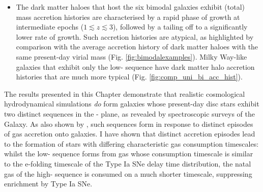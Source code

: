 \begin{itemize}
\item The dark matter haloes that host the six bimodal galaxies exhibit (total) mass accretion histories are characterised by a rapid phase of growth at intermediate epochs ($1 \lesssim z \lesssim 3$), followed by a tailing off to a significantly lower rate of growth. Such accretion histories are atypical, as highlighted by comparison with the average accretion history of dark matter haloes with the same present-day virial mass (Fig. \ref{fig:bimodalexamples}). Milky Way-like galaxies that exhibit only the low-\afe{} sequence have dark matter halo accretion histories that are much more typical (Fig. \ref{fig:comp_uni_bi_acc_hist}). 

\end{itemize}

The results presented in this Chapter demonstrate that realistic cosmological hydrodynamical simulations \emph{do} form galaxies whose present-day disc stars exhibit two distinct sequences in the \afe{}-\feh{} plane, as revealed by spectroscopic surveys of the Galaxy. As also shown by \citet{2017arXiv170807834G}, such sequences form in response to distinct episodes of gas accretion onto galaxies. I have shown that distinct accretion episodes lead to the formation of stars with differing characteristic gas consumption timescales: whilst the low-\afe{} sequence forms from gas whose consumption timescale is similar to the e-folding timescale of the Type Ia SNe delay time distribution, the natal gas of the high-\afe{} sequence is consumed on a much shorter timescale, suppressing enrichment by Type Ia SNe.


